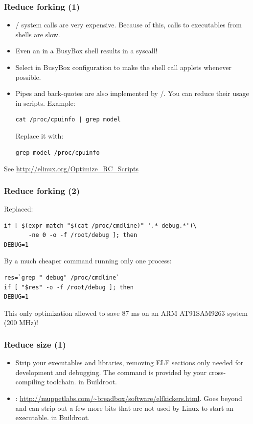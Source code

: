 \begin{frame}[fragile]
\frametitle{Reduce forking (1)}
\begin{itemize}
\item {}/ system calls are very expensive.
      Because of this, calls to executables from shells are slow.
\item Even an  in a BusyBox shell results in a 
syscall!
\item Select  in BusyBox
      configuration to make the shell call applets whenever possible.
\item Pipes and back-quotes are also implemented by
      /.  You can reduce their usage in
      scripts. Example:
      \begin{block}{}
      \begin{verbatim}
cat /proc/cpuinfo | grep model
      \end{verbatim}
      \end{block}
Replace it with:
      \begin{block}{}
      \begin{verbatim}
grep model /proc/cpuinfo
      \end{verbatim}
      \end{block}
\end{itemize}
See \url{http://elinux.org/Optimize_RC_Scripts}
\end{frame}

\begin{frame}[fragile]
\frametitle{Reduce forking (2)}
Replaced:
\begin{block}{}
\begin{verbatim}
if [ $(expr match "$(cat /proc/cmdline)" '.* debug.*')\
       -ne 0 -o -f /root/debug ]; then
DEBUG=1
\end{verbatim}
\end{block}
By a much cheaper command running only one process:
\begin{block}{}
\begin{verbatim}
res=`grep " debug" /proc/cmdline`
if [ "$res" -o -f /root/debug ]; then
DEBUG=1
\end{verbatim}
\end{block}
This only optimization allowed to save 87 ms on an ARM AT91SAM9263
system (200 MHz)!
\end{frame}


\begin{frame}
\frametitle{Reduce size (1)}
\begin{itemize}
	\item Strip your executables and libraries, removing ELF sections
		only needed for development and debugging. The 
		command is provided by your cross-compiling toolchain.
		 in Buildroot.
	\item {}:
		\url{http://muppetlabs.com/~breadbox/software/elfkickers.html}.
		Goes beyond  and can strip out a few more bits
		that are not used by Linux to start an executable.
		 in Buildroot.
\end{itemize}
\end{frame}

